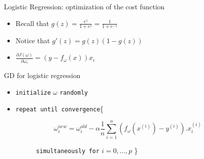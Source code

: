 \documentclass[
  9pt,
  ignorenonframetext,
  aspectratio=169,
  t, dvipsnames]{beamer}
\providecommand{\tightlist}{%
  \setlength{\itemsep}{0pt}\setlength{\parskip}{0pt}}\usepackage{longtable,booktabs,array}
\theoremstyle{definition}
\begin{document}
\begin{frame}[fragile]{Logistic Regression: optimization of the cost
function}
\protect\hypertarget{logistic-regression-optimization-of-the-cost-function-1}{}
\begin{itemize}
\tightlist
\item
  Recall that
  \(\displaystyle g(z) = \frac{e^z}{1+e^{z}} = \frac{1}{1+e^{-z}}\)
\item
  Notice that \(g'(z)=g(z)(1-g(z))\)
\end{itemize}

\pause

\begin{itemize}
\tightlist
\item
  \(\displaystyle \frac{\partial J(\omega)}{\partial \omega_{i}} = (y-f_{\omega}(x))x_{i}\)
\end{itemize}

\pause

\begin{alertblock}{GD for logistic regression}

\begin{itemize}
\tightlist
\item
  \texttt{initialize} \(\omega\) \texttt{randomly}
\item
  \texttt{repeat\ until\ convergence}\{
\end{itemize}

\[\omega_i^{new} = \omega_i^{old} - \alpha \frac{1}{n} \sum_{i=1}^{n}\left(f_{\omega}\left(x^{(i)}\right)-y^{(i)}\right).x_i^{(i)}\]

\(\quad \quad \quad \quad \,\,\) \texttt{simultaneously\ for}
\(i=0,\ldots,p\) \}

\end{alertblock}
\end{frame}
\end{document}
